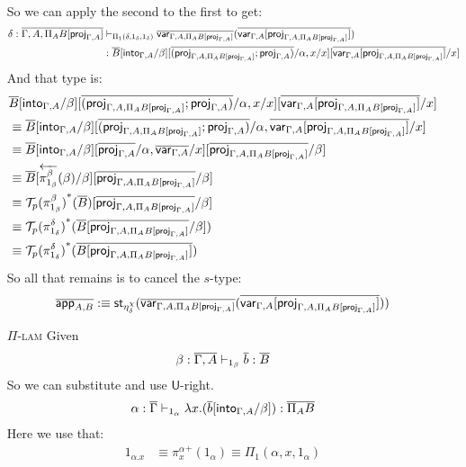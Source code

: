 \documentclass[10pt]{article}
\theoremstyle{definition}
\newcommand{\yields}{\vdash}
\newcommand{\rewrite}[2]{\overleftarrow{#1}(#2)}
\newcommand\UI[2]{\ensuremath{\lambda #1.#2}}
\newcommand\St[2]{\ensuremath{{#1}^*(#2)}}
\newcommand\StI[2]{\ensuremath{\mathsf{st}_{#1}(#2)}}
\newcommand\TrPlus[2]{\ensuremath{{#1}^+(#2)}}
\newcommand\El[2]{\mathcal{T}_{#1}(#2)}
\begin{document}
\begin{enumerate}
\begin{align*}
\end{align*}
So we can apply the second to the first to get:
\begin{align*}
\delta : \upstairs{\Gamma, A, \Pi_A B[\proj{\Gamma, A}]} &\yields_{\Pi_1(\delta, 1_\delta, 1_\delta)} \upstairs{\var{\Gamma, A, \Pi_A B[\proj{\Gamma, A}]}}(\upstairs{\var{\Gamma, A}[\proj{\Gamma, A, \Pi_A B[\proj{\Gamma, A}]}]}) \\&: \upstairs{B}[\into{\Gamma, A}/\beta][\upstairs{(\proj{\Gamma, A, \Pi_A B[\proj{\Gamma, A}]};\proj{\Gamma, A})}/\alpha, x/x][\upstairs{\var{\Gamma, A}[\proj{\Gamma, A, \Pi_A B[\proj{\Gamma, A}]}]}/x]
\end{align*}
And that type is:
\begin{align*}
&\upstairs{B}[\into{\Gamma, A}/\beta][\upstairs{(\proj{\Gamma, A, \Pi_A B[\proj{\Gamma, A}]};\proj{\Gamma, A})}/\alpha, x/x][\upstairs{\var{\Gamma, A}[\proj{\Gamma, A, \Pi_A B[\proj{\Gamma, A}]}]}/x] \\
&\equiv \upstairs{B}[\into{\Gamma, A}/\beta][\upstairs{(\proj{\Gamma, A, \Pi_A B[\proj{\Gamma, A}]};\proj{\Gamma, A})}/\alpha, \upstairs{\var{\Gamma, A}[\proj{\Gamma, A, \Pi_A B[\proj{\Gamma, A}]}]}/x] \\
&\equiv \upstairs{B}[\into{\Gamma, A}/\beta][\upstairs{\proj{\Gamma, A}}/\alpha, \upstairs{\var{\Gamma, A}}/x][\upstairs{\proj{\Gamma, A, \Pi_A B[\proj{\Gamma, A}]}}/\beta] \\
&\equiv \upstairs{B}[\rewrite{\pi^\beta_{1_\beta}}{\beta}/\beta][\upstairs{\proj{\Gamma, A, \Pi_A B[\proj{\Gamma, A}]}}/\beta] \\
&\equiv \St{\El{p}{\pi^\beta_{1_\beta}}}{\upstairs{B}}[\upstairs{\proj{\Gamma, A, \Pi_A B[\proj{\Gamma, A}]}}/\beta] \\
&\equiv \St{\El{p}{\pi^\delta_{1_\delta}}}{\upstairs{B}[\upstairs{\proj{\Gamma, A, \Pi_A B[\proj{\Gamma, A}]}}/\beta]} \\
&\equiv \St{\El{p}{\pi^\delta_{1_\delta}}}{\upstairs{B[\proj{\Gamma, A, \Pi_A B[\proj{\Gamma, A}]}]}} 
\end{align*}
So all that remains is to cancel the $s$-type:
\begin{align*}
\upstairs{\qapp{A,B}} :\equiv \StI{\eta^\chi_\delta}{\upstairs{\var{\Gamma, A, \Pi_A B[\proj{\Gamma, A}]}}(\upstairs{\var{\Gamma, A}[\proj{\Gamma, A, \Pi_A B[\proj{\Gamma, A}]}]})}
\end{align*}

\item[\textsc{$\Pi$-lam}] Given
\begin{align*}
\beta : \upstairs{\Gamma, A} \yields_{1_\beta} \upstairs{b} : \upstairs{B}
\end{align*}
So we can substitute and use $\mathsf{U}$-right.
\begin{align*}
\alpha : \upstairs{\Gamma} \yields_{1_\alpha} \UI{x}{(\upstairs{b}[\into{\Gamma, A}/\beta])} : \upstairs{\Pi_A B}
\end{align*}
Here we use that:
\begin{align*}
1_{\alpha.x} &\equiv \TrPlus{\pi^\alpha_x}{1_\alpha} \equiv \Pi_1(\alpha, x, 1_\alpha)
\end{align*}


\end{enumerate}
\end{document}
